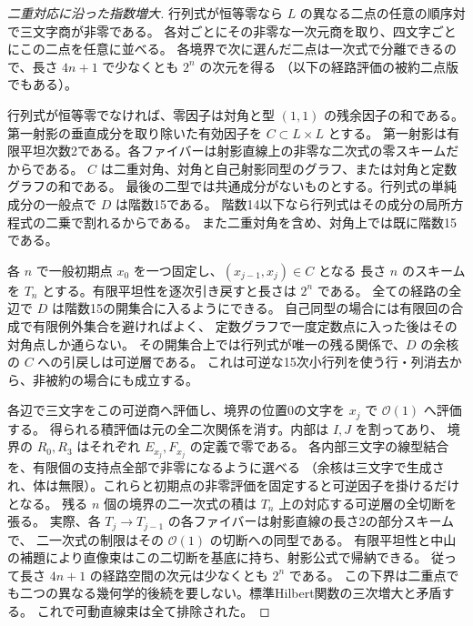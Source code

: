 \begin{proof}[二重対応に沿った指数増大]
行列式が恒等零なら $L$ の異なる二点の任意の順序対で三文字商が非零である。
各対ごとにその非零な一次元商を取り、四文字ごとにこの二点を任意に並べる。
各境界で次に選んだ二点は一次式で分離できるので、長さ $4n+1$ で少なくとも $2^n$ の次元を得る
（以下の経路評価の被約二点版でもある）。

行列式が恒等零でなければ、零因子は対角と型 $(1,1)$ の残余因子の和である。
第一射影の垂直成分を取り除いた有効因子を $C\subset L\times L$ とする。
第一射影は有限平坦次数2である。各ファイバーは射影直線上の非零な二次式の零スキームだからである。
$C$ は二重対角、対角と自己射影同型のグラフ、または対角と定数グラフの和である。
最後の二型では共通成分がないものとする。行列式の単純成分の一般点で $D$ は階数15である。
階数14以下なら行列式はその成分の局所方程式の二乗で割れるからである。
また二重対角を含め、対角上では既に階数15である。

各 $n$ で一般初期点 $x_0$ を一つ固定し、$(x_{j-1},x_j)\in C$ となる
長さ $n$ のスキームを $T_n$ とする。有限平坦性を逐次引き戻すと長さは $2^n$ である。
全ての経路の全辺で $D$ は階数15の開集合に入るようにできる。
自己同型の場合には有限回の合成で有限例外集合を避ければよく、
定数グラフで一度定数点に入った後はその対角点しか通らない。
その開集合上では行列式が唯一の残る関係で、$D$ の余核の $C$ への引戻しは可逆層である。
これは可逆な15次小行列を使う行・列消去から、非被約の場合にも成立する。

各辺で三文字をこの可逆商へ評価し、境界の位置0の文字を $x_j$ で $\mathcal O(1)$ へ評価する。
得られる積評価は元の全二次関係を消す。内部は $I,J$ を割ってあり、
境界の $R_0,R_3$ はそれぞれ $E_{x_j},F_{x_j}$ の定義で零である。
各内部三文字の線型結合を、有限個の支持点全部で非零になるように選べる
（余核は三文字で生成され、体は無限）。これらと初期点の非零評価を固定すると可逆因子を掛けるだけとなる。
残る $n$ 個の境界の二一次式の積は $T_n$ 上の対応する可逆層の全切断を張る。
実際、各 $T_j\to T_{j-1}$ の各ファイバーは射影直線の長さ2の部分スキームで、
二一次式の制限はその $\mathcal O(1)$ の切断への同型である。
有限平坦性と中山の補題により直像束はこの二切断を基底に持ち、射影公式で帰納できる。
従って長さ $4n+1$ の経路空間の次元は少なくとも $2^n$ である。
この下界は二重点でも二つの異なる幾何学的後続を要しない。標準Hilbert関数の三次増大と矛盾する。
これで可動直線束は全て排除された。
\end{proof}
